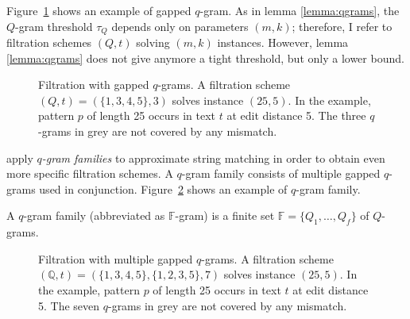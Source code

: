 Figure~\ref{fig:qgrams-gapped} shows an example of gapped $q$-gram.
As in lemma \ref{lemma:qgrams}, the $Q$-gram threshold $\tau_Q$ depends only on parameters $(m,k)$;
therefore, I refer to filtration schemes $(Q,t)$ solving $(m,k)$ instances.
However, lemma \ref{lemma:qgrams} does not give anymore a tight threshold, but only a lower bound.

\begin{figure}[t]
\begin{center}
\caption[Filtration with gapped $q$-grams]{Filtration with gapped $q$-grams. A filtration scheme $(Q,t) = (\{1, 3, 4, 5\},3)$ solves instance $(25,5)$. In the example, pattern $p$ of length 25 occurs in text $t$ at edit distance 5. The three $q$-grams in grey are not covered by any mismatch.}
\label{fig:qgrams-gapped}

\end{center}
\end{figure}

\cite{Kucherov2005} apply \emph{$q$-gram families} to approximate string matching in order to obtain even more specific filtration schemes.
A $q$-gram family consists of multiple gapped $q$-grams used in conjunction.
Figure~\ref{fig:qgrams-multiple} shows an example of $q$-gram family.

\begin{definition}
A $q$-gram family (abbreviated as $\mathbb{F}$-gram) is a finite set $\mathbb{F} = \{ Q_1, \dots, Q_f \}$ of $Q$-grams.
\end{definition}


\begin{figure}[b]
\begin{center}
\caption[Filtration with multiple gapped $q$-grams]{Filtration with multiple gapped $q$-grams. A filtration scheme $(\mathbb{Q},t) = (\{1, 3, 4, 5\},\{1, 2, 3, 5\},7)$ solves instance $(25,5)$. In the example, pattern $p$ of length 25 occurs in text $t$ at edit distance 5. The seven $q$-grams in grey are not covered by any mismatch.}
\label{fig:qgrams-multiple}

\end{center}
\end{figure}

